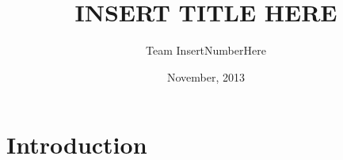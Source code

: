 \documentclass[12pt]{article}
\title{\textbf{INSERT TITLE HERE}}
\author{Team InsertNumberHere}
\date{November, 2013}
\begin{document}
\maketitle
\newpage
\begin{abstract}
\end{abstract}

\section{Introduction}


\end{document}
